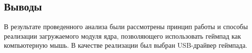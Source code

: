 \subsection{Выводы}
В результате проведенного анализа были рассмотрены принцип работы и способы реализации загружаемого модуля ядра,
позволяющего использовать геймпад как компьютерную мышь. В качестве реализации был выбран USB-драйвер геймпада.

\pagebreak

